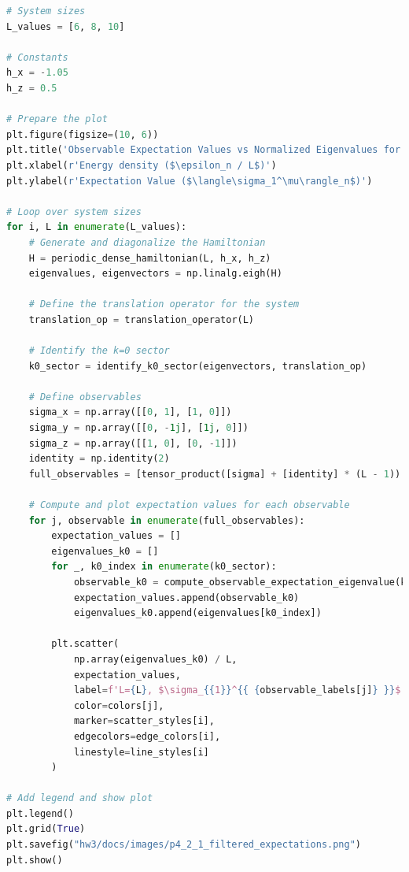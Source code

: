 \documentclass[12pt]{article}
\begin{document}
\begin{lstlisting}[language=Python]
# System sizes
L_values = [6, 8, 10]

# Constants
h_x = -1.05
h_z = 0.5

# Prepare the plot
plt.figure(figsize=(10, 6))
plt.title('Observable Expectation Values vs Normalized Eigenvalues for Different L')
plt.xlabel(r'Energy density ($\epsilon_n / L$)')
plt.ylabel(r'Expectation Value ($\langle\sigma_1^\mu\rangle_n$)')

# Loop over system sizes
for i, L in enumerate(L_values):
    # Generate and diagonalize the Hamiltonian
    H = periodic_dense_hamiltonian(L, h_x, h_z)
    eigenvalues, eigenvectors = np.linalg.eigh(H)

    # Define the translation operator for the system
    translation_op = translation_operator(L)

    # Identify the k=0 sector
    k0_sector = identify_k0_sector(eigenvectors, translation_op)

    # Define observables
    sigma_x = np.array([[0, 1], [1, 0]])
    sigma_y = np.array([[0, -1j], [1j, 0]])
    sigma_z = np.array([[1, 0], [0, -1]])
    identity = np.identity(2)
    full_observables = [tensor_product([sigma] + [identity] * (L - 1)) for sigma in [sigma_x, sigma_y, sigma_z]]

    # Compute and plot expectation values for each observable
    for j, observable in enumerate(full_observables):
        expectation_values = []
        eigenvalues_k0 = []
        for _, k0_index in enumerate(k0_sector):
            observable_k0 = compute_observable_expectation_eigenvalue(k0_index, observable, eigenvectors)
            expectation_values.append(observable_k0)
            eigenvalues_k0.append(eigenvalues[k0_index])
        
        plt.scatter(
            np.array(eigenvalues_k0) / L, 
            expectation_values, 
            label=f'L={L}, $\sigma_{{1}}^{{ {observable_labels[j]} }}$', 
            color=colors[j], 
            marker=scatter_styles[i], 
            edgecolors=edge_colors[i],
            linestyle=line_styles[i]
        )

# Add legend and show plot
plt.legend()
plt.grid(True)
plt.savefig("hw3/docs/images/p4_2_1_filtered_expectations.png")
plt.show()

\end{lstlisting}

\newpage
\end{document}

